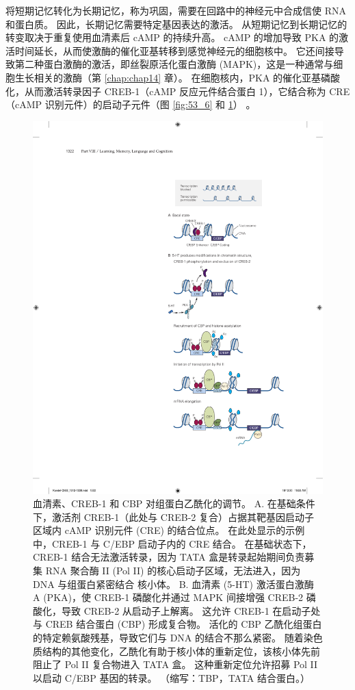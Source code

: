 将短期记忆转化为长期记忆，称为巩固，需要在回路中的神经元中合成信使 RNA 和蛋白质。 因此，长期记忆需要特定基因表达的激活。 从短期记忆到长期记忆的转变取决于重复使用血清素后 cAMP 的持续升高。 cAMP 的增加导致 PKA 的激活时间延长，从而使激酶的催化亚基转移到感觉神经元的细胞核中。 它还间接导致第二种蛋白激酶的激活，即丝裂原活化蛋白激酶 (MAPK)，这是一种通常与细胞生长相关的激酶（第 \ref{chap:chap14} 章）。 在细胞核内，PKA 的催化亚基磷酸化，从而激活转录因子 CREB-1（cAMP 反应元件结合蛋白 1），它结合称为 CRE（cAMP 识别元件）的启动子元件（图 \ref{fig:53_6} 和 \ref{fig:53_7}） 。

\begin{figure}[htbp]
	\centering
	\includegraphics[width=0.6\linewidth]{chap53/fig_53_7}
	\caption{血清素、CREB-1 和 CBP 对组蛋白乙酰化的调节。 A. 在基础条件下，激活剂 CREB-1（此处与 CREB-2 复合）占据其靶基因启动子区域内 cAMP 识别元件 (CRE) 的结合位点。 在此处显示的示例中，CREB-1 与 C/EBP 启动子内的 CRE 结合。 在基础状态下，CREB-1 结合无法激活转录，因为 TATA 盒是转录起始期间负责募集 RNA 聚合酶 II (Pol II) 的核心启动子区域，无法进入，因为 DNA 与组蛋白紧密结合 核小体。 B. 血清素 (5-HT) 激活蛋白激酶 A (PKA)，使 CREB-1 磷酸化并通过 MAPK 间接增强 CREB-2 磷酸化，导致 CREB-2 从启动子上解离。 这允许 CREB-1 在启动子处与 CREB 结合蛋白 (CBP) 形成复合物。 活化的 CBP 乙酰化组蛋白的特定赖氨酸残基，导致它们与 DNA 的结合不那么紧密。 随着染色质结构的其他变化，乙酰化有助于核小体的重新定位，该核小体先前阻止了 Pol II 复合物进入 TATA 盒。 这种重新定位允许招募 Pol II 以启动 C/EBP 基因的转录。 （缩写：TBP，TATA 结合蛋白。）}
	\label{fig:53_7}
\end{figure}


